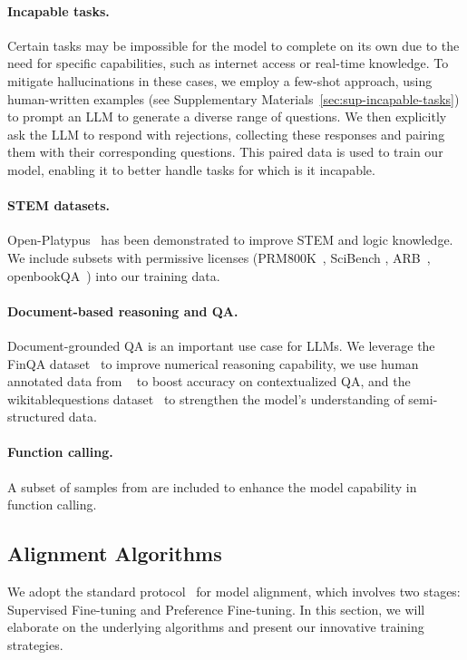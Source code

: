 \documentclass[11pt]{article}
\begin{document}
\paragraph{Incapable tasks.}
Certain tasks may be impossible for the model to complete on its own due to the need for specific capabilities, such as internet access or real-time knowledge.
To mitigate hallucinations in these cases, we employ a few-shot approach, using human-written examples (see Supplementary Materials~\ref{sec:sup-incapable-tasks}) to prompt an LLM to generate a diverse range of questions. We then explicitly ask the LLM to respond with rejections, collecting these responses and pairing them with their corresponding questions. This paired data is used to train our model, enabling it to better handle tasks for which is it incapable.

\paragraph{STEM datasets.}
Open-Platypus~\citep{lee2023platypus} has been demonstrated to improve STEM and logic knowledge. We include subsets with permissive licenses (PRM800K~\citep{lightman2023let}, SciBench \citep{wang2023scibench}, ARB~\citep{sawada2023arb}, openbookQA~\citep{mihaylov2018can}) into our training data.

\paragraph{Document-based reasoning and QA.} Document-grounded QA is an important use case for LLMs. We leverage the FinQA dataset~\citep{chen2021finqa} to improve  numerical reasoning capability, we use human annotated data from ~\citep{liu2024chatqa} to boost accuracy on contextualized QA, and the wikitablequestions dataset~\citep{pasupat2015compositional} to strengthen the model's understanding of semi-structured data.

\paragraph{Function calling.} A subset of samples from \citep{glaive-function-calling-v2} are included to enhance the model capability in function calling.




\subsection{Alignment Algorithms}
\label{sec:alignment-algorithms}
We adopt the standard protocol~\citep{ouyang2022training} for model alignment, which involves two stages: Supervised Fine-tuning and Preference Fine-tuning.  In this section, we will elaborate on the underlying algorithms and present our innovative training strategies.
\end{document}
